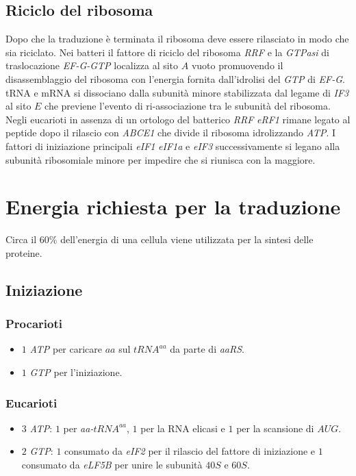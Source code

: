 \subsection{Riciclo del ribosoma}
Dopo che la traduzione \`e terminata il ribosoma deve essere rilasciato in modo che sia riciclato. Nei batteri il fattore di riciclo del ribosoma \emph{RRF} e la \emph{GTPasi} 
di traslocazione \emph{EF-G-GTP} localizza al sito $A$ vuoto promuovendo il disassemblaggio del ribosoma con l'energia fornita dall'idrolisi del \emph{GTP} di \emph{EF-G}. tRNA
e mRNA si dissociano dalla subunit\`a minore stabilizzata dal legame di \emph{IF3} al sito $E$ che previene l'evento di ri-associazione tra le subunit\`a del ribosoma. Negli eucarioti
in assenza di un ortologo del batterico \emph{RRF} \emph{eRF1} rimane legato al peptide dopo il rilascio con \emph{ABCE1} che divide il ribosoma idrolizzando \emph{ATP}. I fattori 
di iniziazione principali \emph{eIF1} \emph{eIF1a} e \emph{eIF3} successivamente si legano alla subunit\`a ribosomiale minore per impedire che si riunisca con la maggiore.
\section{Energia richiesta per la traduzione}
Circa il $60\%$ dell'energia di una cellula viene utilizzata per la sintesi delle proteine. 
\subsection{Iniziazione}
\subsubsection{Procarioti}
\begin{itemize}
	\item $1$ \emph{ATP} per caricare $aa$ sul \emph{$tRNA^{aa}$} da parte di \emph{aaRS}. 
	\item $1$ \emph{GTP} per l'iniziazione.
\end{itemize}
\subsubsection{Eucarioti}
\begin{itemize}
	\item $3$ \emph{ATP}: $1$ per \emph{aa-$tRNA^{aa}$}, $1$ per la RNA elicasi e $1$ per la scansione di $AUG$.
	\item $2$ \emph{GTP}: $1$ consumato da \emph{eIF2} per il rilascio del fattore di iniziazione e $1$ consumato da \emph{eLF5B} per unire le subunit\`a $40S$ e $60S$. 
\end{itemize}
